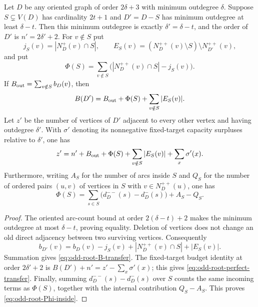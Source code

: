 \begin{lemma}\label{lem:odd-root-transfer}
Let $D$ be any oriented graph of order $2\delta+3$ with minimum
outdegree $\delta$.  Suppose $S\subsetneq V(D)$ has cardinality $2t+1$
and $D'=D-S$ has minimum outdegree at least $\delta-t$.  Then this
minimum outdegree is exactly $\delta'=\delta-t$, and the order of
$D'$ is $n'=2\delta'+2$.
For $v\notin S$ put
\[
 j_S(v)=|N_D^+(v)\cap S|,\qquad
 E_S(v)=(N_D^{++}(v)\setminus S)\setminus N_{D'}^{++}(v),
\]
and put
\[
 \Phi(S)=\sum_{v\notin S}
       \bigl(|N_D^{++}(v)\cap S|-j_S(v)\bigr).
\]
If $B_{\rm out}=\sum_{v\notin S}b_D(v)$, then
\begin{equation}\label{eq:odd-root-B-transfer}
 B(D')=B_{\rm out}+\Phi(S)+\sum_{v\notin S}|E_S(v)|.
\end{equation}
Let $z'$ be the number of vertices of $D'$ adjacent to every other
vertex and having outdegree $\delta'$.  With $\sigma'$ denoting its
nonnegative fixed-target capacity surpluses relative to $\delta'$, one has
\begin{equation}\label{eq:odd-root-perfect-transfer}
 z'=n'+B_{\rm out}+\Phi(S)
            +\sum_{v\notin S}|E_S(v)|+\sum_x\sigma'(x).
\end{equation}
Furthermore, writing $A_S$ for the number of arcs inside $S$ and
$Q_S$ for the number of ordered pairs $(u,v)$ of vertices in $S$
with $v\in N_D^{++}(u)$, one has
\begin{equation}\label{eq:odd-root-Phi-inside}
 \Phi(S)=\sum_{s\in S}\bigl(d_D^{--}(s)-d_D^-(s)\bigr)+A_S-Q_S.
\end{equation}
\end{lemma}
\begin{proof}
The oriented arc-count bound at order $2(\delta-t)+2$ makes the
minimum outdegree at most $\delta-t$, proving equality.
Deletion of vertices does not change an old direct adjacency between
two surviving vertices.  Consequently
\[
 b_{D'}(v)=b_D(v)-j_S(v)+|N_D^{++}(v)\cap S|+|E_S(v)|.
\]
Summation gives \eqref{eq:odd-root-B-transfer}.  The fixed-target
budget identity at order $2\delta'+2$ is
$B(D')+n'=z'-\sum_x\sigma'(x)$; this gives
\eqref{eq:odd-root-perfect-transfer}.  Finally, summing
$d_D^{--}(s)-d_D^-(s)$ over $S$ counts the same incoming terms as
$\Phi(S)$, together with the internal contribution $Q_S-A_S$.
This proves \eqref{eq:odd-root-Phi-inside}.
\end{proof}
